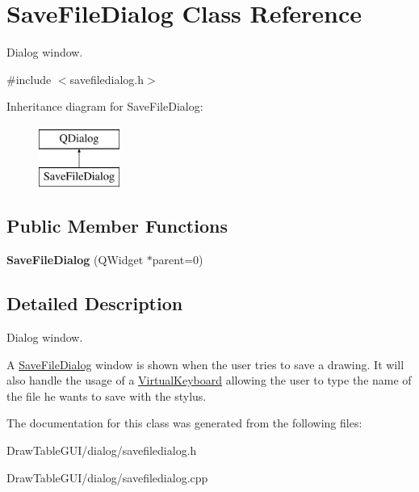 \hypertarget{classSaveFileDialog}{}\section{Save\+File\+Dialog Class Reference}
\label{classSaveFileDialog}


Dialog window.  




{\ttfamily \#include $<$savefiledialog.\+h$>$}

Inheritance diagram for Save\+File\+Dialog\+:\begin{figure}[H]
\begin{center}
\leavevmode
\includegraphics[height=2.000000cm]{classSaveFileDialog}
\end{center}
\end{figure}
\subsection*{Public Member Functions}
\begin{DoxyCompactItemize}
\item 
\hypertarget{classSaveFileDialog_a2b427585afca4759c040e5e158f0823b}{}{\bfseries Save\+File\+Dialog} (Q\+Widget $\ast$parent=0)\label{classSaveFileDialog_a2b427585afca4759c040e5e158f0823b}

\end{DoxyCompactItemize}


\subsection{Detailed Description}
Dialog window. 

A \hyperlink{classSaveFileDialog}{Save\+File\+Dialog} window is shown when the user tries to save a drawing. It will also handle the usage of a \hyperlink{classVirtualKeyboard}{Virtual\+Keyboard} allowing the user to type the name of the file he wants to save with the stylus. 

The documentation for this class was generated from the following files\+:\begin{DoxyCompactItemize}
\item 
Draw\+Table\+G\+U\+I/dialog/savefiledialog.\+h\item 
Draw\+Table\+G\+U\+I/dialog/savefiledialog.\+cpp\end{DoxyCompactItemize}

